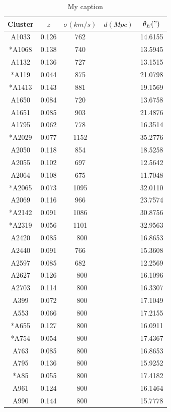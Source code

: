 \begin{table}[]
\centering

\begin{tabular}{ccccc}
Cluster & $z$   & $\sigma(km/s)$ & $d(Mpc)$ & $\theta_{E}(")$ \\ \hline \hline
A1033   & 0.126 & 762            &  & 14.6155  \\
*A1068  & 0.138 & 740            &  & 13.5945  \\
A1132   & 0.136 & 727            &  & 13.1515   \\
*A119   & 0.044 & 875            &  & 21.0798   \\
*A1413  & 0.143 & 881            &  & 19.1569   \\
A1650   & 0.084 & 720            &  & 13.6758   \\
A1651   & 0.085 & 903            &  & 21.4876   \\
A1795   & 0.062 & 778            &  & 16.3514   \\
*A2029  & 0.077 & 1152           &  & 35.2776   \\
A2050   & 0.118 & 854            &  & 18.5258   \\
A2055   & 0.102 & 697            &  & 12.5642   \\
A2064   & 0.108 & 675            &  & 11.7048   \\
*A2065  & 0.073 & 1095           &  & 32.0110   \\
A2069   & 0.116 & 966            &  & 23.7574   \\
*A2142  & 0.091 & 1086           &  & 30.8756   \\
*A2319  & 0.056 & 1101           &  & 32.9563   \\
A2420   & 0.085 & ~800           &  & 16.8653   \\
A2440   & 0.091 & 766            &  & 15.3608   \\
A2597   & 0.085 & 682            &  & 12.2569   \\
A2627   & 0.126 & ~800           &  & 16.1096   \\
A2703   & 0.114 & ~800           &  & 16.3307   \\
A399    & 0.072 & ~800           &  & 17.1049   \\
A553    & 0.066 & ~800           &  & 17.2155   \\
*A655   & 0.127 & ~800           &  & 16.0911   \\
*A754   & 0.054 & ~800           &  & 17.4367   \\
A763    & 0.085 & ~800           &  & 16.8653   \\
A795    & 0.136 & ~800           &  & 15.9252   \\
*A85    & 0.055 & ~800           &  & 17.4182   \\
A961    & 0.124 & ~800           &  & 16.1464   \\
A990    & 0.144 & ~800           &  & 15.7778   
\end{tabular}
\caption{My caption}
\label{my-label}
\end{table}


